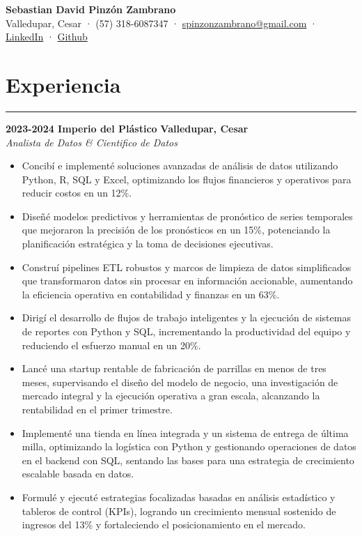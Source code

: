 \documentclass[9pt,a4paper]{article}
\newcommand{\cvevent}[4]{%
  {\noindent \textbf{#1 #2} \hfill \textbf{#3}\\%
   \textit{#4}\\[0pt]}%
}
\begin{document}
\begin{center}
    \textbf{\LARGE Sebastian David Pinzón Zambrano} \\
    Valledupar, Cesar · (57) 318-6087347 · 
    \href{mailto:spinzonzambrano@gmail.com}{spinzonzambrano@gmail.com} ·
    \href{https://www.linkedin.com/in/sebastiandpinzon/?locale=es_ES}{LinkedIn} · 
    \href{https://github.com/Ares-Infenus}{Github}
\end{center}
\vspace{-1em}

\section*{Experiencia}
\vspace{-\baselineskip}
\noindent\rule{\linewidth}{0.5pt}

\cvevent{2023-2024}{Imperio del Plástico}{Valledupar, Cesar}{Analista de Datos \& Cientifico de Datos}
\vspace{-\baselineskip}
\begin{itemize}[noitemsep, topsep=0pt]
    \item Concibí e implementé soluciones avanzadas de análisis de datos utilizando Python, R, SQL y Excel, optimizando los flujos financieros y operativos para reducir costos en un 12\%.
    \item Diseñé modelos predictivos y herramientas de pronóstico de series temporales que mejoraron la precisión de los pronósticos en un 15\%, potenciando la planificación estratégica y la toma de decisiones ejecutivas.
    \item Construí pipelines ETL robustos y marcos de limpieza de datos simplificados que transformaron datos sin procesar en información accionable, aumentando la eficiencia operativa en contabilidad y finanzas en un 63\%.
    \item Dirigí el desarrollo de flujos de trabajo inteligentes y la ejecución de sistemas de reportes con Python y SQL, incrementando la productividad del equipo y reduciendo el esfuerzo manual en un 20\%.
    \item Lancé una startup rentable de fabricación de parrillas en menos de tres meses, supervisando el diseño del modelo de negocio, una investigación de mercado integral y la ejecución operativa a gran escala, alcanzando la rentabilidad en el primer trimestre.
    \item Implementé una tienda en línea integrada y un sistema de entrega de última milla, optimizando la logística con Python y gestionando operaciones de datos en el backend con SQL, sentando las bases para una estrategia de crecimiento escalable basada en datos.
    \item Formulé y ejecuté estrategias focalizadas basadas en análisis estadístico y tableros de control (KPIs), logrando un crecimiento mensual sostenido de ingresos del 13\% y fortaleciendo el posicionamiento en el mercado.
\end{itemize}
\end{document}
